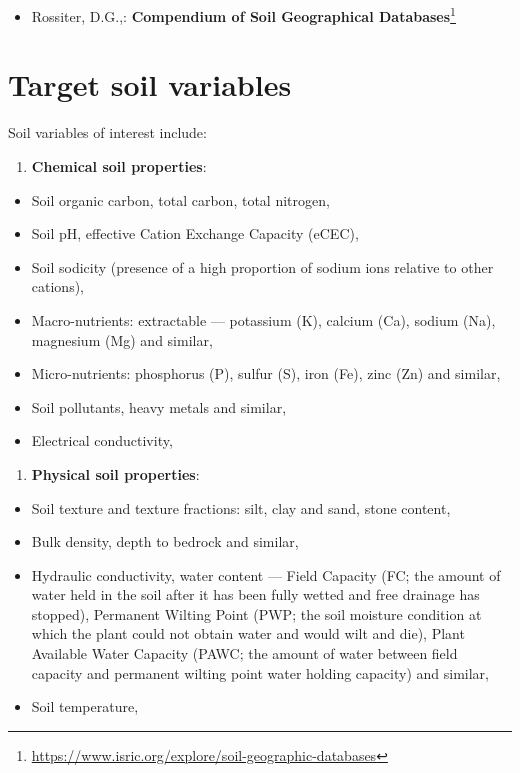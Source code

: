 \documentclass[
  graybox,natbib,nospthms]{svmono}
\providecommand{\tightlist}{%
  \setlength{\itemsep}{0pt}\setlength{\parskip}{0pt}}
\providecommand{\tightlist}{\setlength{\itemsep}{0pt}\setlength{\parskip}{0pt}}
\renewcommand{\href}[2]{#2 (\url{#1})}
\renewcommand{\href}[2]{#2\footnote{\url{#1}}}
\begin{document}
\begin{itemize}
\tightlist
\item
  Rossiter, D.G.,: \href{https://www.isric.org/explore/soil-geographic-databases}{\textbf{Compendium of Soil Geographical Databases}}\\
\end{itemize}

\hypertarget{target-soil-variables}{%
\section{Target soil variables}\label{target-soil-variables}}

Soil variables of interest include:

\begin{enumerate}
\def\labelenumi{\arabic{enumi}.}
\tightlist
\item
  \textbf{Chemical soil properties}:
\end{enumerate}

\begin{itemize}
\tightlist
\item
  Soil organic carbon, total carbon, total nitrogen,
\item
  Soil pH, effective Cation Exchange Capacity (eCEC),
\item
  Soil sodicity (presence of a high proportion of sodium ions relative to other cations),
\item
  Macro-nutrients: extractable --- potassium (K), calcium (Ca), sodium
  (Na), magnesium (Mg) and similar,
\item
  Micro-nutrients: phosphorus (P), sulfur (S), iron (Fe), zinc (Zn)
  and similar,
\item
  Soil pollutants, heavy metals and similar,
\item
  Electrical conductivity,
\end{itemize}

\begin{enumerate}
\def\labelenumi{\arabic{enumi}.}
\setcounter{enumi}{1}
\tightlist
\item
  \textbf{Physical soil properties}:
\end{enumerate}

\begin{itemize}
\tightlist
\item
  Soil texture and texture fractions: silt, clay and sand, stone content,
\item
  Bulk density, depth to bedrock and similar,
\item
  Hydraulic conductivity, water content --- Field Capacity (FC; the amount of water
  held in the soil after it has been fully wetted and free drainage has stopped),
  Permanent Wilting Point (PWP; the soil moisture condition at which the plant could
  not obtain water and would wilt and die), Plant Available Water Capacity (PAWC;
  the amount of water between field capacity and permanent wilting point water holding capacity) and
  similar,
\item
  Soil temperature,
\end{itemize}
\end{document}
